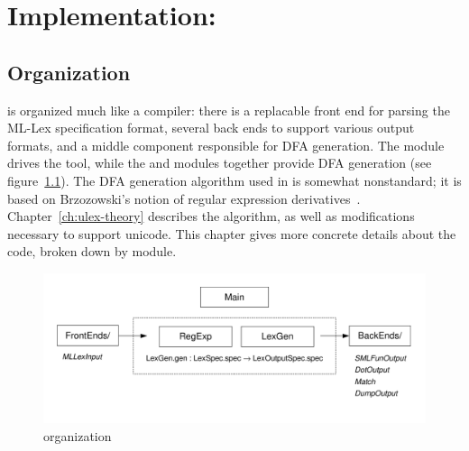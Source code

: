 \chapter[\ulex]{Implementation: \ulex}

\section{Organization}


\ulex{} is organized much like a compiler: there is a replacable front end for
parsing the ML-Lex specification format, several back ends to support various
output formats, and a middle component responsible for DFA generation.  The
 module drives the tool, while the  and  modules
together provide DFA generation (see figure~\ref{fig:ml-flex}).  The DFA
generation algorithm used in \ulex{} is somewhat nonstandard; it is based on
Brzozowski's notion of regular expression derivatives~\cite{derivatives}. 
Chapter~\ref{ch:ulex-theory} describes the algorithm, as well as modifications
necessary to support unicode.  This chapter gives more concrete
details about the code, broken down by module.

\begin{figure}\label{fig:ml-flex}
\begin{center}
\ifpdf
  \includegraphics[scale=0.8]{impl-pic.pdf}
\fi
\end{center}
\caption{\ulex{} organization}
\end{figure}

\section{}\label{sec:reg-exp}

